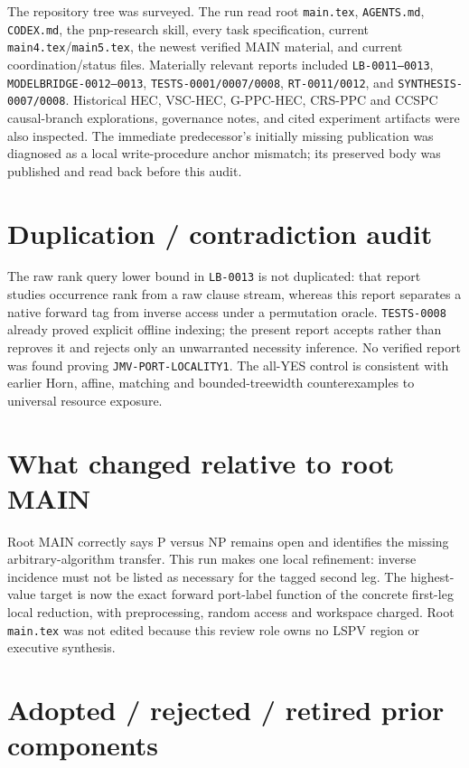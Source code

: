\documentclass[11pt]{article}
\begin{document}
The repository tree was surveyed.  The run read root \texttt{main.tex},
\texttt{AGENTS.md}, \texttt{CODEX.md}, the pnp-research skill, every task
specification, current \texttt{main4.tex}/\texttt{main5.tex}, the newest
verified MAIN material, and current coordination/status files.  Materially
relevant reports included \texttt{LB-0011--0013},
\texttt{MODELBRIDGE-0012--0013}, \texttt{TESTS-0001/0007/0008},
\texttt{RT-0011/0012}, and \texttt{SYNTHESIS-0007/0008}.  Historical HEC,
VSC-HEC, G-PPC-HEC, CRS-PPC and CCSPC causal-branch explorations, governance
notes, and cited experiment artifacts were also inspected.  The immediate
predecessor's initially missing publication was diagnosed as a local
write-procedure anchor mismatch; its preserved body was published and read
back before this audit.

\section{Duplication / contradiction audit}

The raw rank query lower bound in \texttt{LB-0013} is not duplicated: that
report studies occurrence rank from a raw clause stream, whereas this report
separates a native forward tag from inverse access under a permutation
oracle.  \texttt{TESTS-0008} already proved explicit offline indexing; the
present report accepts rather than reproves it and rejects only an unwarranted
necessity inference.  No verified report was found proving
\texttt{JMV-PORT-LOCALITY1}.  The all-YES control is consistent with earlier
Horn, affine, matching and bounded-treewidth counterexamples to universal
resource exposure.

\section{What changed relative to root MAIN}

Root MAIN correctly says P versus NP remains open and identifies the missing
arbitrary-algorithm transfer.  This run makes one local refinement: inverse
incidence must not be listed as necessary for the tagged second leg.  The
highest-value target is now the exact forward port-label function of the
concrete first-leg local reduction, with preprocessing, random access and
workspace charged.  Root \texttt{main.tex} was not edited because this review
role owns no LSPV region or executive synthesis.

\section{Adopted / rejected / retired prior components}
\end{document}
